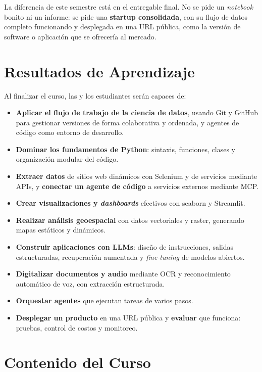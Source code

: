 \documentclass[11pt]{article}
\begin{document}
La diferencia de este semestre est\'a en el entregable final. No se pide un \emph{notebook} bonito ni un informe: se pide una \textbf{startup consolidada}, con su flujo de datos completo funcionando y desplegada en una URL p\'ublica, como la versi\'on de software o aplicaci\'on que se ofrecer\'ia al mercado.

\section{Resultados de Aprendizaje}

Al finalizar el curso, las y los estudiantes ser\'an capaces de:

\begin{itemize}
\item \textbf{Aplicar el flujo de trabajo de la ciencia de datos}, usando Git y GitHub para gestionar versiones de forma colaborativa y ordenada, y agentes de c\'odigo como entorno de desarrollo.
\item \textbf{Dominar los fundamentos de Python}: sintaxis, funciones, clases y organizaci\'on modular del c\'odigo.
\item \textbf{Extraer datos} de sitios web din\'amicos con Selenium y de servicios mediante APIs, y \textbf{conectar un agente de c\'odigo} a servicios externos mediante MCP.
\item \textbf{Crear visualizaciones y \emph{dashboards}} efectivos con seaborn y Streamlit.
\item \textbf{Realizar an\'alisis geoespacial} con datos vectoriales y raster, generando mapas est\'aticos y din\'amicos.
\item \textbf{Construir aplicaciones con LLMs}: dise\~no de instrucciones, salidas estructuradas, recuperaci\'on aumentada y \emph{fine-tuning} de modelos abiertos.
\item \textbf{Digitalizar documentos y audio} mediante OCR y reconocimiento autom\'atico de voz, con extracci\'on estructurada.
\item \textbf{Orquestar agentes} que ejecutan tareas de varios pasos.
\item \textbf{Desplegar un producto} en una URL p\'ublica y \textbf{evaluar} que funciona: pruebas, control de costos y monitoreo.
\end{itemize}

\section{Contenido del Curso}
\end{document}
